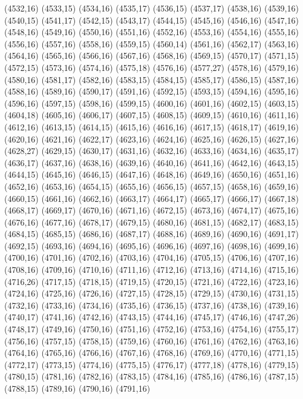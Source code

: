 (4532,16)
(4533,15)
(4534,16)
(4535,17)
(4536,15)
(4537,17)
(4538,16)
(4539,16)
(4540,15)
(4541,17)
(4542,15)
(4543,17)
(4544,15)
(4545,16)
(4546,16)
(4547,16)
(4548,16)
(4549,16)
(4550,16)
(4551,16)
(4552,16)
(4553,16)
(4554,16)
(4555,16)
(4556,16)
(4557,16)
(4558,16)
(4559,15)
(4560,14)
(4561,16)
(4562,17)
(4563,16)
(4564,16)
(4565,16)
(4566,16)
(4567,16)
(4568,16)
(4569,15)
(4570,17)
(4571,15)
(4572,15)
(4573,16)
(4574,16)
(4575,18)
(4576,16)
(4577,27)
(4578,16)
(4579,16)
(4580,16)
(4581,17)
(4582,16)
(4583,15)
(4584,15)
(4585,17)
(4586,15)
(4587,16)
(4588,16)
(4589,16)
(4590,17)
(4591,16)
(4592,15)
(4593,15)
(4594,16)
(4595,16)
(4596,16)
(4597,15)
(4598,16)
(4599,15)
(4600,16)
(4601,16)
(4602,15)
(4603,15)
(4604,18)
(4605,16)
(4606,17)
(4607,15)
(4608,15)
(4609,15)
(4610,16)
(4611,16)
(4612,16)
(4613,15)
(4614,15)
(4615,16)
(4616,16)
(4617,15)
(4618,17)
(4619,16)
(4620,16)
(4621,16)
(4622,17)
(4623,16)
(4624,16)
(4625,16)
(4626,15)
(4627,16)
(4628,27)
(4629,15)
(4630,17)
(4631,16)
(4632,16)
(4633,16)
(4634,16)
(4635,17)
(4636,17)
(4637,16)
(4638,16)
(4639,16)
(4640,16)
(4641,16)
(4642,16)
(4643,15)
(4644,15)
(4645,16)
(4646,15)
(4647,16)
(4648,16)
(4649,16)
(4650,16)
(4651,16)
(4652,16)
(4653,16)
(4654,15)
(4655,16)
(4656,15)
(4657,15)
(4658,16)
(4659,16)
(4660,15)
(4661,16)
(4662,16)
(4663,17)
(4664,17)
(4665,17)
(4666,17)
(4667,18)
(4668,17)
(4669,17)
(4670,16)
(4671,16)
(4672,15)
(4673,16)
(4674,17)
(4675,16)
(4676,16)
(4677,16)
(4678,17)
(4679,15)
(4680,16)
(4681,15)
(4682,17)
(4683,15)
(4684,15)
(4685,15)
(4686,16)
(4687,17)
(4688,16)
(4689,16)
(4690,16)
(4691,17)
(4692,15)
(4693,16)
(4694,16)
(4695,16)
(4696,16)
(4697,16)
(4698,16)
(4699,16)
(4700,16)
(4701,16)
(4702,16)
(4703,16)
(4704,16)
(4705,15)
(4706,16)
(4707,16)
(4708,16)
(4709,16)
(4710,16)
(4711,16)
(4712,16)
(4713,16)
(4714,16)
(4715,16)
(4716,26)
(4717,15)
(4718,15)
(4719,15)
(4720,15)
(4721,16)
(4722,16)
(4723,16)
(4724,16)
(4725,16)
(4726,16)
(4727,15)
(4728,15)
(4729,15)
(4730,16)
(4731,15)
(4732,16)
(4733,16)
(4734,16)
(4735,16)
(4736,15)
(4737,16)
(4738,16)
(4739,16)
(4740,17)
(4741,16)
(4742,16)
(4743,15)
(4744,16)
(4745,17)
(4746,16)
(4747,26)
(4748,17)
(4749,16)
(4750,16)
(4751,16)
(4752,16)
(4753,16)
(4754,16)
(4755,17)
(4756,16)
(4757,15)
(4758,15)
(4759,16)
(4760,16)
(4761,16)
(4762,16)
(4763,16)
(4764,16)
(4765,16)
(4766,16)
(4767,16)
(4768,16)
(4769,16)
(4770,16)
(4771,15)
(4772,17)
(4773,15)
(4774,16)
(4775,15)
(4776,17)
(4777,18)
(4778,16)
(4779,15)
(4780,15)
(4781,16)
(4782,16)
(4783,15)
(4784,16)
(4785,16)
(4786,16)
(4787,15)
(4788,15)
(4789,16)
(4790,16)
(4791,16)

